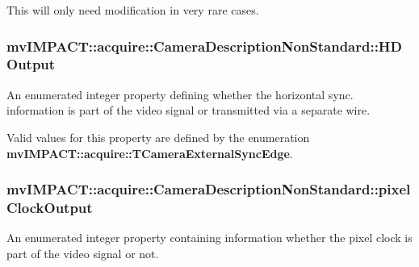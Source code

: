 This will only need modification in very rare cases. \hypertarget{classmv_i_m_p_a_c_t_1_1acquire_1_1_camera_description_non_standard_ac1ded162cacf263999ae46d8b00bd0ec}{
\subsubsection[{H\+D\+Output}]{ mv\+I\+M\+P\+A\+C\+T\+::acquire\+::\+Camera\+Description\+Non\+Standard\+::\+H\+D\+Output}}\label{classmv_i_m_p_a_c_t_1_1acquire_1_1_camera_description_non_standard_ac1ded162cacf263999ae46d8b00bd0ec}


An enumerated integer property defining whether the horizontal sync. information is part of the video signal or transmitted via a separate wire. 

Valid values for this property are defined by the enumeration {\bfseries mv\+I\+M\+P\+A\+C\+T\+::acquire\+::\+T\+Camera\+External\+Sync\+Edge}. \hypertarget{classmv_i_m_p_a_c_t_1_1acquire_1_1_camera_description_non_standard_a06f48f20eb41f74b5c9f0a0f954d0d99}{
\subsubsection[{pixel\+Clock\+Output}]{ mv\+I\+M\+P\+A\+C\+T\+::acquire\+::\+Camera\+Description\+Non\+Standard\+::pixel\+Clock\+Output}}\label{classmv_i_m_p_a_c_t_1_1acquire_1_1_camera_description_non_standard_a06f48f20eb41f74b5c9f0a0f954d0d99}


An enumerated integer property containing information whether the pixel clock is part of the video signal or not. 

